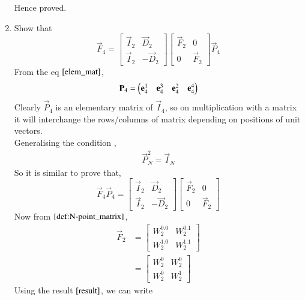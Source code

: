 \documentclass[journal,12pt,twocolumn]{IEEEtran}
\renewcommand\thesection{\arabic{section}}
\begin{document}
\begin{enumerate}[label=\arabic*.,ref=\thesection.\theenumi]
	Hence proved.
	
	\item Show that 
	\begin{equation}
		\vec{F}_{4}=
		\begin{bmatrix}
			\vec{I}_{2} & \vec{D}_{2} \\
			\vec{I}_{2} & -\vec{D}_{2}
		\end{bmatrix}
		\begin{bmatrix}
			\vec{F}_{2} & 0 \\
			0 & \vec{F}_{2}
		\end{bmatrix}
		\vec{P}_{4}
	\end{equation}
	\solution From the eq $\eqref{elem_mat}$,
	\begin{align}
		\mathbf{P}_4 = \begin{pmatrix}\mathbf{e}_4^{1} &\mathbf{e}_4^{3} &\mathbf{e}_4^{2} &\mathbf{e}_4^{4} \end{pmatrix}
	\end{align}
	Clearly $\vec{P}_4$ is an elementary matrix of $\vec{I}_{4}$, so on multiplication with a matrix it will interchange the rows/columns of matrix depending on positions of unit vectors.\\
	Generalising the condition ,
	\begin{align}
		\vec{P}_{N}^2 = \vec{I}_{N} \label{fft-4}
	\end{align}
	So it is similar to prove that, 
	\begin{equation} 
		\vec{F}_{4}\vec{P}_{4}=
		\begin{bmatrix}
			\vec{I}_{2} & \vec{D}_{2} \\
			\vec{I}_{2} & -\vec{D}_{2}
		\end{bmatrix}
		\begin{bmatrix}
			\vec{F}_{2} & 0 \\
			0 & \vec{F}_{2}   
		\end{bmatrix}                    
	\end{equation}
	Now from $\eqref{def:N-point_matrix}$,
	\begin{align}
		\vec{F}_{2} &= 
		\begin{bmatrix}
			W_2^{0.0} & W_2^{0.1} \\
			W_2^{1.0} & W_2^{1.1}
		\end{bmatrix} \\
		&= \begin{bmatrix}
			W_2^{0} & W_2^{0} \\
			W_2^{0} & W_2^{1}
		\end{bmatrix}
	\end{align}
	Using the result $\eqref{result}$, we can write
	\begin{align}

\end{align}
\end{enumerate}
\end{document}

